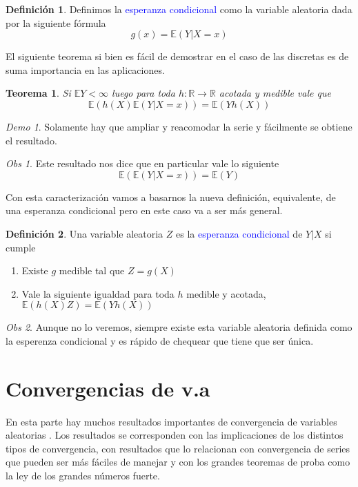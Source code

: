 \documentclass[11pt]{article}
\theoremstyle{plain} %
\newtheorem{teorema}{Teorema}
\theoremstyle{definition}
\newtheorem*{definicion}{Definici\'{o}n} %
\theoremstyle{remark}
\newtheorem{obs}{Obs}
\newtheorem*{demo}{Demo}
\def\E{\mathbb{E}}
\def\R{\mathbb{R}}
\def\va{variable aleatoria }
\def\vas{variables aleatorias }
\def\blue{\textcolor{blue}}
\begin{document}
\begin{definicion}
	Definimos la \blue{esperanza condicional} como la \va dada por la siguiente fórmula
	\[ g(x) = \E (Y|X=x) \]
\end{definicion}

El siguiente teorema si bien es fácil de demostrar en el caso de las discretas es de suma importancia en las aplicaciones.


\begin{teorema}	
	Si $\E Y < \infty$ luego para toda $h:\R \to \R$ acotada y medible vale que 
	\[ \E(h(X) \E(Y|X=x)) = \E (Yh(X))  \] 
\end{teorema}

\begin{demo}
	Solamente hay que ampliar y reacomodar la serie y fácilmente se obtiene el resultado.
\end{demo}

\begin{obs}
	Este resultado nos dice que en particular vale lo siguiente
	\[ \E( \E(Y|X=x)) = \E (Y)  \] 
\end{obs}

Con esta caracterización vamos a basarnos la nueva definición, equivalente, de una esperanza condicional pero en este caso va a ser más general.

\begin{definicion}
	Una \va $Z$ es la \blue{esperanza condicional} de $Y|X$ si cumple
	\begin{enumerate}
		\item Existe $g$ medible tal que $Z=g(X)$
		\item Vale la siguiente igualdad para toda $h$ medible y acotada, $\E(h(X) Z) = \E (Yh(X))$
	\end{enumerate}
\end{definicion}

\begin{obs}
	Aunque no lo veremos, siempre existe esta \va definida como la esperenza condicional y es rápido de chequear que tiene que ser única.
\end{obs}



\bigskip
\section{Convergencias de v.a}

En esta parte hay muchos resultados importantes de convergencia de \vas. Los resultados se corresponden con las implicaciones de los distintos tipos de convergencia, con resultados que lo relacionan con convergencia de series que pueden ser más fáciles de manejar y con los grandes teoremas de proba como la ley de los grandes números fuerte.
\end{document}
